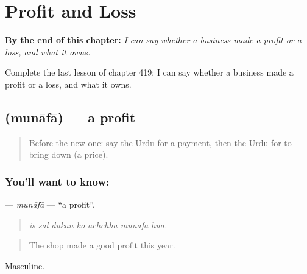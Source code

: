 
\chapter{Profit and Loss}
\label{ch:ur-profit-and-loss}

\begin{chapteropening}
\textbf{By the end of this chapter:} \emph{I can say whether a business made a profit or a loss, and what it owns.}

Complete the last lesson of chapter 419: I can say whether a business made a profit or a loss, and what it owns.
\end{chapteropening}

\section[\texorpdfstring{\ur{منافع} (munāfā)}{منافع (munāfā)}]{ (munāfā) — a profit}

\label{lesson:UR-C419-munafa}



\begin{quote}
Before the new one: say the Urdu for a payment, then the Urdu for to bring down (a price).
\end{quote}

\subsection*{You'll want to know: }
\textbf{} — \emph{munāfā} — \textquotedblleft{}a profit\textquotedblright{}.

\begin{quote}
      
\end{quote}

\begin{quote}
\emph{is sāl dukān ko achchhā munāfā huā.}
\end{quote}

\begin{quote}
The shop made a good profit this year.
\end{quote}

Masculine.

